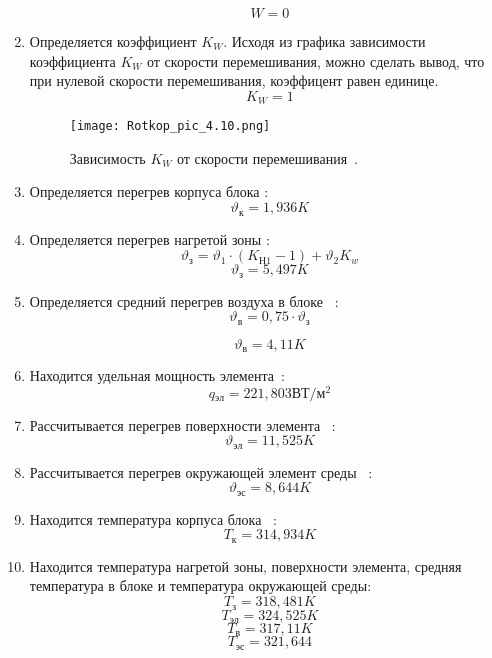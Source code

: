 \begin{enumerate}[label={\arabic*.}]
    $$W = 0$$

  \item Определяется коэффициент $K_W$.
    Исходя из графика зависимости коэффициента $K_W$ от скорости
перемешивания, можно сделать вывод, что при нулевой скорости
перемешивания, коэффицент равен единице.
$$K_W = 1$$
\begin{figure}[h]
  \centering
  \texttt{[image: Rotkop\_pic\_4.10.png]}
  \caption{Зависимость $K_W$ от скорости
перемешивания~\cite{Rotkop1976}. }
\end{figure}

\item Определяется перегрев корпуса блока \cite{Rotkop1976}:
$$\vartheta\mathrm{_к} = 1,936 K$$
\item Определяется перегрев нагретой зоны \cite{Rotkop1976}:
  \begin{equation}
    \vartheta\mathrm{_з} = \vartheta_1 \cdot (K\mathrm{_{Н1}} - 1) + \vartheta_2 K_w
  \end{equation}
$$    \vartheta\mathrm{_з} = 5,497 K$$

\item Определяется средний перегрев воздуха в блоке ~\cite{Rotkop1976}:
  \begin{equation}
    \vartheta\mathrm{_в} = 0,75 \cdot \vartheta\mathrm{_з}
  \end{equation}

  $$\vartheta\mathrm{_в} = 4,11K$$
\item Находится удельная мощность элемента~\cite{Rotkop1976}:
  $$q\mathrm{_{эл}} =221,803\mathrm{ВТ/м^2} $$
\item Рассчитывается перегрев поверхности элемента ~\cite{Rotkop1976}:
  $$\vartheta\mathrm{_{эл}} =11,525K$$

\item Рассчитывается перегрев окружающей элемент среды ~\cite{Rotkop1976}:
  $$\vartheta\mathrm{_{эс}} = 8,644K $$
  
\item Находится температура корпуса блока ~\cite{Rotkop1976}:
  $$T\mathrm{_{к}} = 314,934 K$$
\item Находится температура нагретой зоны, поверхности элемента,
    средняя температура в блоке и температура окружающей среды:
    $$T\mathrm{_з} = 318,481 K$$
    $$T\mathrm{_{эл}} = 324,525 K$$
    $$T\mathrm{_{в}} = 317,11 K$$
    $$T\mathrm{_{эс}} =321,644$$

    
\end{enumerate}